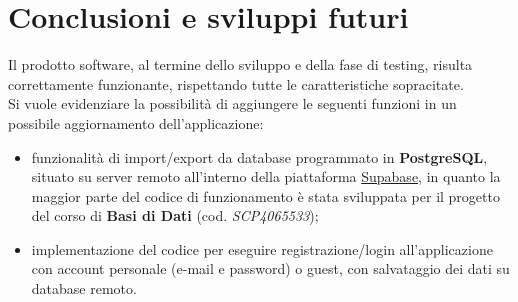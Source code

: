 \documentclass[a4paper,10pt]{article}
\begin{document}
	\section{Conclusioni e sviluppi futuri}
	Il prodotto software, al termine dello sviluppo e della fase di testing, risulta correttamente funzionante, rispettando tutte le caratteristiche sopracitate.\\
	Si vuole evidenziare la possibilità di aggiungere le seguenti funzioni in un possibile aggiornamento dell'applicazione:
	\begin{itemize}
		\item funzionalità di import/export da database programmato in \textbf{PostgreSQL}, situato su server remoto all'interno della piattaforma \href{https://supabase.com/}{Supabase}, in quanto la maggior parte del codice di funzionamento è stata sviluppata per il progetto del corso di \textbf{Basi di Dati} (cod. \textit{SCP4065533});
		\item implementazione del codice per eseguire registrazione/login all'applicazione con account personale (e-mail e password) o guest, con salvataggio dei dati su database remoto.
	\end{itemize}
\end{document}
